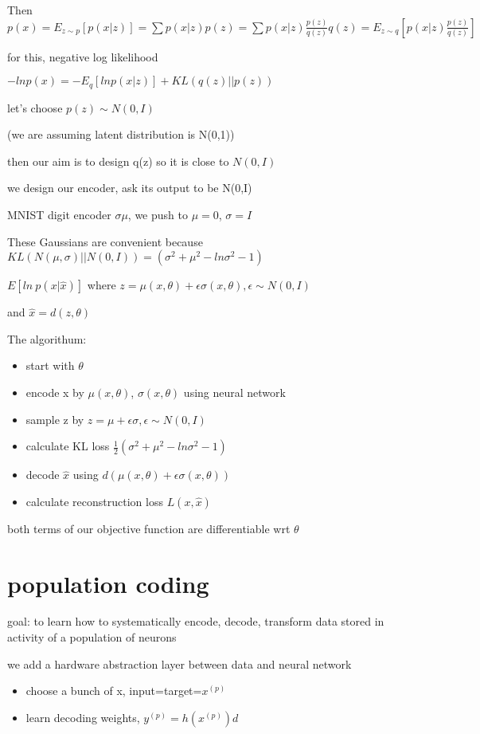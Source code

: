 \documentclass[10pt]{article}
\theoremstyle{break}
\begin{document}
Then $p(x) = E_{z\sim p}[p(x|z)] = \sum p(x|z)p(z) = \sum p(x|z)\frac{p(z)}{q(z)} q(z)=E_{z\sim q}[p(x|z) \frac{p(z)}{q(z)}]$

for this, negative log likelihood 

$-ln p(x) = -E_q[ln p(x|z)] + KL(q(z)|| p(z))$

let's choose $p(z) \sim N(0,I)$

(we are assuming latent distribution is N(0,1))


then our aim is to design q(z) so it is close to $N(0, I)$


we design our encoder, ask its output to be N(0,I)

MNIST digit encoder $\sigma \mu$, we push to $\mu = 0$, $\sigma = I$

These Gaussians are convenient because $KL(N(\mu,\sigma)|| N(0,I))=(\sigma^2+\mu^2-ln\sigma^2-1)$

$E[ln\ p(x|\hat{x})]$ where $z=\mu(x,\theta)+\epsilon\sigma(x,\theta), \epsilon\sim N(0,I)$

and $\hat{x}= d(z,\theta)$

The algorithum:
\begin{itemize}
    \item start with $\theta$ 
    \item encode x by $\mu(x,\theta)$, $\sigma(x,\theta)$ using neural network
    \item sample z by $z = \mu + \epsilon \sigma, \epsilon\sim N(0,I)$
    \item calculate KL loss $\frac{1}{2}(\sigma^2+\mu^2-ln \sigma^2 -1)$
    \item decode $\hat{x}$ using $d(\mu(x,\theta)+\epsilon\sigma(x,\theta))$
    \item calculate reconstruction loss $L(x,\hat{x})$
\end{itemize}

both terms of our objective function are differentiable wrt $\theta$

\section{population coding}
goal: to learn how to systematically encode, decode, transform data stored in activity of a population of neurons 

we add a hardware abstraction layer between data and neural network 

\begin{itemize}
    \item choose a bunch of x, input=target=$x^{(p)}$
    \item learn decoding weights, $y^{(p)} = h(x^{(p)})d$
\end{itemize}
\end{document}
